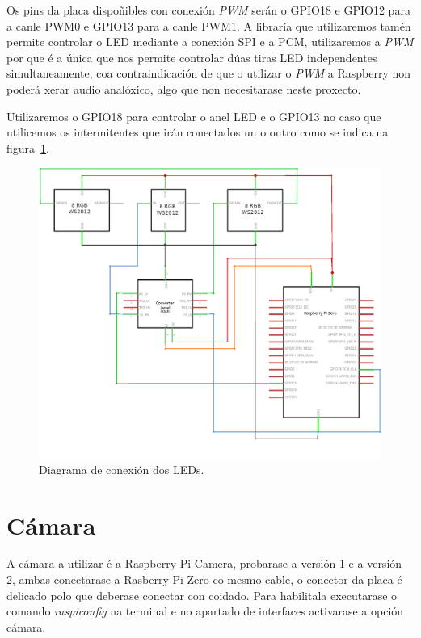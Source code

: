 Os pins da placa dispoñibles con conexión \emph{PWM} serán o GPIO18 e GPIO12 para a canle PWM0 e GPIO13 para a canle PWM1. A libraría que utilizaremos tamén permite controlar o LED mediante a conexión SPI e a PCM, utilizaremos a \emph{PWM} por que é a única que nos permite controlar dúas tiras LED independentes simultaneamente, coa contraindicación de que o utilizar o \emph{PWM} a Raspberry non poderá xerar audio analóxico, algo que non necesitarase neste proxecto.

Utilizaremos o GPIO18 para controlar o anel LED e o GPIO13 no caso que utilicemos os intermitentes que irán conectados un o outro como se indica na figura~\ref{fig:conexions_leds}.

\begin{figure}[tbp]
  \centering
  \includegraphics[scale=1]{imaxes/circuito-leds.png}
  \caption{Diagrama de conexión dos LEDs.}
  \label{fig:conexions_leds}
\end{figure}

\section{Cámara}

A cámara a utilizar é a Raspberry Pi Camera, probarase a versión 1 e a versión 2, ambas conectarase a Rasberry Pi Zero co mesmo cable, o conector da placa é delicado polo que deberase conectar con coidado. Para habilitala executarase o comando \emph{raspiconfig} na terminal e no apartado de interfaces activarase a opción cámara.

